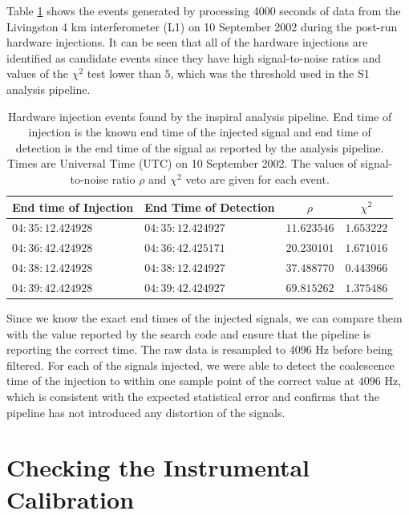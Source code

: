 Table \ref{t:triggers} shows the events generated by processing 4000 seconds
of data from the Livingston 4 km interferometer (L1) on 10 September 2002
during the post-run hardware injections.  It can be seen that all of
the hardware injections are identified as candidate events since they have
high signal-to-noise ratios and values of the $\chi^2$ test lower than $5$,
which was the threshold used in the S1 analysis pipeline\cite{abbott2003b}.
\begin{table}[htb]
  \begin{flushright}
  \begin{tabular}{l|l|c|c}
  End time of Injection&End Time of Detection&$\rho$&$\chi^2$\\
  \hline
  $04:35:12.424928$ & $04:35:12.424927$ & $11.623546$ & $1.653222$ \\
  $04:36:42.424928$ & $04:36:42.425171$ & $20.230101$ & $1.671016$ \\
  $04:38:12.424928$ & $04:38:12.424927$ & $37.488770$ & $0.443966$ \\
  $04:39:42.424928$ & $04:39:42.424927$ & $69.815262$ & $1.375486$ \\
  \end{tabular}
  \end{flushright}
  \caption{%
  Hardware injection events found by the inspiral analysis pipeline. End time
  of injection is the known end time of the injected signal and end time of
  detection is the end time of the signal as reported by the analysis
  pipeline. Times are Universal Time (UTC) on 10 September 2002. The values of
  signal-to-noise ratio $\rho$ and $\chi^2$ veto are given for each event.
  }
\label{t:triggers}
\end{table}

Since we know the exact end times of the injected signals, we can compare them
with the value reported by the search code and ensure that the pipeline is
reporting the correct time. The raw data is resampled to $4096$ Hz before
being filtered. For each of the signals injected, we were able to detect the
coalescence time of the injection to within one sample point of the correct
value at $4096$ Hz, which is consistent with the expected statistical error
and confirms that the pipeline has not introduced any distortion of the
signals.

\section{Checking the Instrumental Calibration}
\label{s:calibration}

